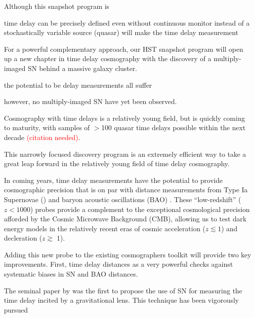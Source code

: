 
Although this snapshot program is


time delay can be precisely defined even
without continuous monitor 
instead of a stochastically variable source (quasar) will make the
time delay measurement 





For a powerful complementary approach, our HST snapshot program will
open up a new chapter in time delay cosmography with the discovery of
a multiply-imaged SN behind a massive galaxy cluster.  

 the potential
to be 
delay measurements all suffer 


however, no multiply-imaged SN have yet been observed.  

Cosmography with time delays is a relatively young field, but is
quickly coming to maturity, with samples of $>$100 quasar time delays
possible within the next decade \textcolor{red}{(citation
  needed)}. 

This
narrowly focused discovery program is an extremely efficient way to
take a great leap forward in the relatively young field of time delay
cosmography.


 In
coming years, time delay measurements have the potential to provide
cosmographic precision that is on par with distance measurements from
Type Ia Supernovae (\SNIa) and baryon acoustic oscillations (BAO)
\citep{Linder:2011,Treu:2013}.  These ``low-redshift'' ($z<1000$) probes
provide a complement to the exceptional cosmological
precision afforded by the Cosmic Microwave Background (CMB), allowing
us to test dark energy models in the relatively recent eras of cosmic
acceleration ($z\lesssim 1$) and decleration ($z\gtrsim$ 1).  

Adding this new probe to the existing cosmographers
toolkit will provide two key improvements. 
First, time delay distances as a 
 very powerful checks
against systematic biases in SN and BAO distances. 



The seminal paper by \citet{Refsdal:1964} was the first to propose the
use of SN for measuring the time delay incited by a gravitational
lens.   This technique has been vigorously pursued 
